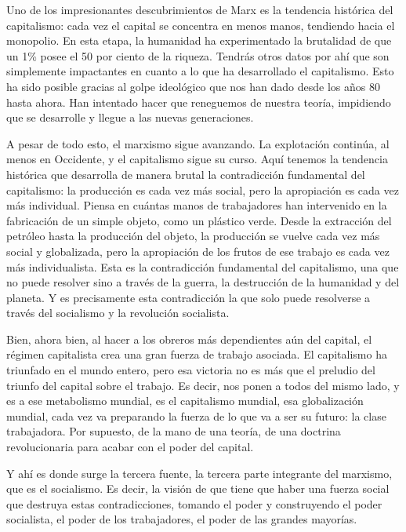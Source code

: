 \documentclass[
  jou,
  floatsintext,
  longtable,
  a4paper,
  nolmodern,
  notxfonts,
  notimes,
  12pt,
  colorlinks=true,linkcolor=blue,citecolor=blue,urlcolor=blue]{apa7}
\begin{document}
Uno de los impresionantes descubrimientos de Marx es la tendencia
histórica del capitalismo: cada vez el capital se concentra en menos
manos, tendiendo hacia el monopolio. En esta etapa, la humanidad ha
experimentado la brutalidad de que un 1\% posee el 50 por ciento de la
riqueza. Tendrás otros datos por ahí que son simplemente impactantes en
cuanto a lo que ha desarrollado el capitalismo. Esto ha sido posible
gracias al golpe ideológico que nos han dado desde los años 80 hasta
ahora. Han intentado hacer que reneguemos de nuestra teoría, impidiendo
que se desarrolle y llegue a las nuevas generaciones.

A pesar de todo esto, el marxismo sigue avanzando. La explotación
continúa, al menos en Occidente, y el capitalismo sigue su curso. Aquí
tenemos la tendencia histórica que desarrolla de manera brutal la
contradicción fundamental del capitalismo: la producción es cada vez más
social, pero la apropiación es cada vez más individual. Piensa en
cuántas manos de trabajadores han intervenido en la fabricación de un
simple objeto, como un plástico verde. Desde la extracción del petróleo
hasta la producción del objeto, la producción se vuelve cada vez más
social y globalizada, pero la apropiación de los frutos de ese trabajo
es cada vez más individualista. Esta es la contradicción fundamental del
capitalismo, una que no puede resolver sino a través de la guerra, la
destrucción de la humanidad y del planeta. Y es precisamente esta
contradicción la que solo puede resolverse a través del socialismo y la
revolución socialista.

Bien, ahora bien, al hacer a los obreros más dependientes aún del
capital, el régimen capitalista crea una gran fuerza de trabajo
asociada. El capitalismo ha triunfado en el mundo entero, pero esa
victoria no es más que el preludio del triunfo del capital sobre el
trabajo. Es decir, nos ponen a todos del mismo lado, y es a ese
metabolismo mundial, es el capitalismo mundial, esa globalización
mundial, cada vez va preparando la fuerza de lo que va a ser su futuro:
la clase trabajadora. Por supuesto, de la mano de una teoría, de una
doctrina revolucionaria para acabar con el poder del capital.

Y ahí es donde surge la tercera fuente, la tercera parte integrante del
marxismo, que es el socialismo. Es decir, la visión de que tiene que
haber una fuerza social que destruya estas contradicciones, tomando el
poder y construyendo el poder socialista, el poder de los trabajadores,
el poder de las grandes mayorías.
\end{document}
